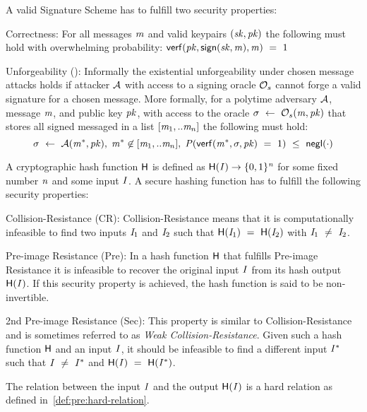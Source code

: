 \begin{definition}
    A valid Signature Scheme has to fulfill two security properties:
    \begin{asparaitem}
        \item Correctness: For all messages $\mathit{m}$ and valid keypairs $(\mathit{sk}, \mathit{pk})$ the following must hold with overwhelming probability: $\mathsf{verf}(\mathit{pk}, \mathsf{sign}(\mathit{sk}, \mathit{m}), \mathit{m}) ~=~ 1$
        \item Unforgeability (\cnstEUFCMA): Informally the existential unforgeability under chosen message attacks holds if attacker $\mathcal{A}$ with access to a signing oracle $\mathcal{O}_{s}$ cannot forge a valid signature for a chosen message.
        More formally, for a polytime adversary $\mathcal{A}$, message $\mathit{m}$, and public key $\mathit{pk}$, with access to the oracle $\sigma ~\leftarrow~ \mathcal{O}_{s}(\mathit{m},\mathit{pk})$ that stores all signed messaged in a list $[\mathit{m}_1,..\mathit{m}_n]$ the following must hold:
        \[ \sigma ~\leftarrow~ \mathcal{A}(\mathit{m}^*, \mathit{pk}), \; \mathit{m}^* \not\in [\mathit{m}_1,..\mathit{m}_n], \; \mathit{P}(\mathsf{verf}(\mathit{m}^*, \sigma, \mathit{pk}) ~=~ 1) ~\leq~ \mathsf{negl}(\cdot) \]
    \end{asparaitem}
\end{definition}

\begin{definition}\label{def:pre:hash-function}
    A cryptographic hash function $\mathsf{H}$ is defined as $\mathsf{H} (\mathit{I}) \rightarrow \{0,1\}^{\mathit{n}}$ for some fixed number $\mathit{n}$ and some input $\mathit{I}$.
    A secure hashing function has to fulfill the following security properties:
    \begin{asparaitem}
        \item Collision-Resistance (CR): Collision-Resistance means that it is computationally infeasible to find two inputs $\mathit{I}_1$ and $\mathit{I}_2$ such that
        $\mathsf{H} (\mathit{I}_1) ~=~ \mathsf{H} (\mathit{I}_2)$ with $\mathit{I}_1 ~\neq~ \mathit{I}_2$.
        \item Pre-image Resistance (Pre): In a hash function $\mathsf{H}$ that fulfills Pre-image Resistance it is infeasible to recover the original input $\mathit{I}$ from its hash output $\mathsf{H} (\mathit{I})$.
        If this security property is achieved, the hash function is said to be non-invertible.
        \item 2nd Pre-image Resistance (Sec):  This property is similar to Collision-Resistance and is sometimes referred to as \textit{Weak Collision-Resistance}.
        Given such a hash function $\mathsf{H}$ and an input $\mathit{I}$, it should be infeasible to find a different input $\mathit{I}^*$ such that $\mathit{I} ~\neq~ \mathit{I}^*$
        and $\mathsf{H} (\mathit{I}) ~=~ \mathsf{H} (\mathit{I}^*)$.
    \end{asparaitem}
    The relation between the input $\mathit{I}$ and the output $\mathsf{H} (\mathit{I})$ is a hard relation as defined in~\cref{def:pre:hard-relation}.
\end{definition}

